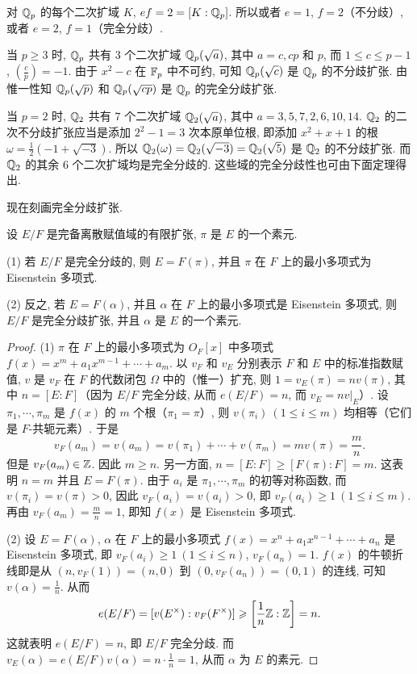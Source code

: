 \begin{example}
对 $\mathbb{Q}_p$ 的每个二次扩域 $K$, $ef=2=[K:\mathbb{Q}_p]$. 所以或者 $e=1$, $f=2$（不分歧）, 或者 $e=2$, $f=1$（完全分歧）.

当 $p\geqslant 3$ 时, $\mathbb{Q}_p$ 共有 $3$ 个二次扩域 $\mathbb{Q}_p(\sqrt{a})$, 其中 $a=c,cp$ 和 $p$, 而 $1\leqslant c\leqslant p-1$, $\left(\frac{c}{p}\right)=-1$. 由于 $x^2-c$ 在 $\mathbb{F}_p$ 中不可约, 可知 $\mathbb{Q}_p(\sqrt{c})$ 是 $\mathbb{Q}_p$ 的不分歧扩张. 由惟一性知 $\mathbb{Q}_p(\sqrt{p})$ 和 $\mathbb{Q}_p(\sqrt{cp})$ 是 $\mathbb{Q}_p$ 的完全分歧扩张.

当 $p=2$ 时, $\mathbb{Q}_2$ 共有 $7$ 个二次扩域 $\mathbb{Q}_2(\sqrt{a})$, 其中 $a=3,5,7,2,6,10,14$. $\mathbb{Q}_2$ 的二次不分歧扩张应当是添加 $2^2-1=3$ 次本原单位根, 即添加 $x^2+x+1$ 的根 $\omega=\frac{1}{2}(-1+\sqrt{-3})$. 所以 $\mathbb{Q}_2(\omega)=\mathbb{Q}_2(\sqrt{-3})=\mathbb{Q}_2(\sqrt{5})$ 是 $\mathbb{Q}_2$ 的不分歧扩张. 而 $\mathbb{Q}_2$ 的其余 $6$ 个二次扩域均是完全分歧的. 这些域的完全分歧性也可由下面定理得出.
\end{example}

现在刻画完全分歧扩张.

\begin{theorem}\label{thm:8.19}
设 $E/F$ 是完备离散赋值域的有限扩张, $\pi$ 是 $E$ 的一个素元.

(1) 若 $E/F$ 是完全分歧的, 则 $E=F(\pi)$, 并且 $\pi$ 在 $F$ 上的最小多项式为 Eisenstein 多项式.

(2) 反之, 若 $E=F(\alpha)$, 并且 $\alpha$ 在 $F$ 上的最小多项式是 Eisenstein 多项式, 则 $E/F$ 是完全分歧扩张, 并且 $\alpha$ 是 $E$ 的一个素元.
\end{theorem}

\begin{proof}
(1) $\pi$ 在 $F$ 上的最小多项式为 $O_F[x]$ 中多项式 $f(x)=x^m+a_1x^{m-1}+\cdots+a_m$. 以 $v_F$ 和 $v_E$ 分别表示 $F$ 和 $E$ 中的标准指数赋值, $v$ 是 $v_F$ 在 $F$ 的代数闭包 $\Omega$ 中的（惟一）扩充, 则 $1=v_E(\pi)=nv(\pi)$, 其中 $n=[E:F]$（因为 $E/F$ 完全分歧, 从而 $e(E/F)=n$, 而 $v_E=nv|_E$）. 设 $\pi_1,\cdots,\pi_m$ 是 $f(x)$ 的 $m$ 个根（$\pi_1=\pi$）, 则 $v(\pi_i)\ (1\leqslant i\leqslant m)$ 均相等（它们是 $F$-共轭元素）. 于是
\[
  v_F(a_m)=v(a_m)=v(\pi_1)+\cdots+v(\pi_m)=mv(\pi)=\frac{m}{n}.
\]
但是 $v_F(a_m)\in\mathbb{Z}$. 因此 $m\geqslant n$. 另一方面, $n=[E:F]\geqslant[F(\pi):F]=m$. 这表明 $n=m$ 并且 $E=F(\pi)$. 由于 $a_i$ 是 $\pi_1,\cdots,\pi_m$ 的初等对称函数, 而 $v(\pi_i)=v(\pi)>0$, 因此 $v_F(a_i)=v(a_i)>0$, 即 $v_F(a_i)\geqslant 1\ (1\leqslant i\leqslant m)$. 再由 $v_F(a_m)=\frac{m}{n}=1$, 即知 $f(x)$ 是 Eisenstein 多项式.

(2) 设 $E=F(\alpha)$, $\alpha$ 在 $F$ 上的最小多项式 $f(x)=x^n+a_1x^{n-1}+\cdots+a_n$ 是 Eisenstein 多项式, 即 $v_F(a_i)\geqslant 1\ (1\leqslant i\leqslant n)$, $v_F(a_n)=1$. $f(x)$ 的牛顿折线即是从 $(n,v_F(1))=(n,0)$ 到 $(0,v_F(a_n))=(0,1)$ 的连线, 可知 $v(\alpha)=\frac{1}{n}$. 从而
\[
  e(E/F)=[v(E^{\times}):v_F(F^{\times})]\geqslant\left[\frac{1}{n}\mathbb{Z}:\mathbb{Z}\right]=n.
\]
这就表明 $e(E/F)=n$, 即 $E/F$ 完全分歧. 而 $v_E(\alpha)=e(E/F)v(\alpha)=n\cdot\frac{1}{n}=1$, 从而 $\alpha$ 为 $E$ 的素元.
\end{proof}

